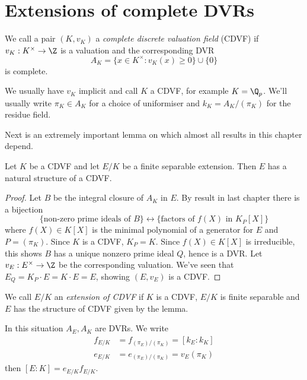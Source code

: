 \documentclass[a4paper]{article}
\begin{document}
\section{Extensions of complete DVRs}

\begin{definition}
  We call a pair \((K, v_K)\) a \emph{complete discrete valuation field} (CDVF) if \(v_K: K^\times \to \Z\) is a valuation and the corresponding DVR
  \[
    A_K = \{x \in K^\times: v_K(x) \geq 0\} \cup \{0\}
  \]
  is complete.
\end{definition}

We usually have \(v_K\) implicit and call \(K\) a CDVF, for example \(K = \Q_p\). We'll usually write \(\pi_K \in A_K\) for a choice of uniformiser and \(k_K = A_K/(\pi_K)\) for the residue field.

Next is an extremely important lemma on which almost all results in this chapter depend.

\begin{lemma}
  Let \(K\) be a CDVF and let \(E/K\) be a finite separable extension. Then \(E\) has a natural structure of a CDVF.
\end{lemma}

\begin{proof}
  Let \(B\) be the integral closure of \(A_K\) in \(E\). By result in last chapter there is a bijection
  \[
    \{\text{non-zero prime ideals of \(B\)}\} \longleftrightarrow \{\text{factors of \(f(X)\) in \(K_P[X]\)}\}
  \]
  where \(f(X) \in K[X]\) is the minimal polynomial of a generator for \(E\) and \(P = (\pi_K)\). Since \(K\) is a CDVF, \(K_P = K\). Since \(f(X) \in K[X]\) is irreducible, this shows \(B\) has a unique nonzero prime ideal \(Q\), hence is a DVR. Let \(v_E: E^\times \to \Z\) be the corresponding valuation. We've seen that \(E_Q = K_P \cdot E = K \cdot E = E\), showing \((E, v_E)\) is a CDVF.
\end{proof}

\begin{definition}
  We call \(E/K\) an \emph{extension of CDVF} if \(K\) is a CDVF, \(E/K\) is finite separable and \(E\) has the structure of CDVF given by the lemma.
\end{definition}

In this situation \(A_E, A_K\) are DVRs. We write
\begin{align*}
  f_{E/K} &= f_{(\pi_E)/(\pi_K)} = [k_E: k_K] \\
  e_{E/K} &= e_{(\pi_E)/(\pi_K)} = v_E(\pi_K)
\end{align*}
then \([E: K] = e_{E/K} f_{E/K}\).
\end{document}

